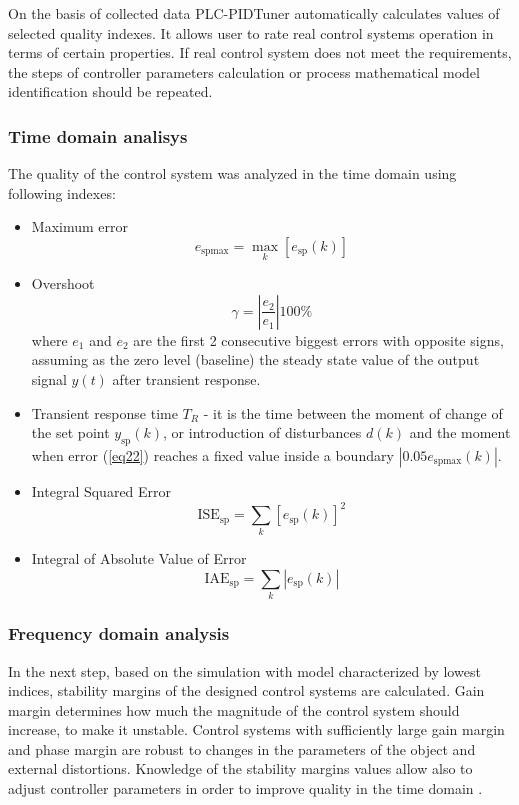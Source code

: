 \documentclass{amcs}
\begin{document}
On the basis of collected data PLC-PIDTuner automatically calculates values of selected quality indexes. It allows user to rate real control systems operation in terms of certain properties. If real control system does not meet the requirements, the steps of controller parameters  calculation or process mathematical model identification should be repeated.
%
\subsubsection{Time domain analisys}
%
The quality of the control system was analyzed in the time domain using following indexes: 
\begin{itemize}
	\item Maximum error 
	\begin{equation}
	e_{\text{sp}\max}=\max_{k}[e_{\text{sp}}(k)]
	\end{equation}\label{eq22}
	\item Overshoot 
	\begin{equation}
	\gamma=\left|\dfrac{e_2}{e_1}\right|100\%
	\end{equation}\label{eq24}
	where $e_1$ and $e_2$ are the first 2 consecutive biggest errors with opposite signs, assuming as the zero level (baseline) the steady state value of the output signal $y(t)$ after transient response.
	\item Transient response time $T_{R}$ - it is the time between the moment of change of the set point $y_{\text{sp}}(k)$, or introduction of disturbances $d(k)$ and the moment when error (\ref{eq22}) reaches a fixed value inside a boundary $|0.05 e_{\text{sp}\max}(k)|$. 
	\item Integral Squared Error 
	\begin{equation}
	\text{ISE}_{\text{sp}}=\sum_{k}[e_{\text{sp}}(k)]^{2} 
	\end{equation}\label{eq25}
	\item Integral of Absolute Value of Error 
	\begin{equation}
	\text{IAE}_{\text{sp}}=\sum_{k}|e_{\text{sp}}(k)| 
	\end{equation}\label{eq26}
\end{itemize}

\subsubsection{Frequency domain analysis}
%
In the next step, based on the simulation with model characterized by lowest indices, stability margins of the designed control systems are calculated. Gain margin determines how much the magnitude of the control system should increase, to make it unstable. Control systems with sufficiently large gain margin and phase margin are robust to changes in the parameters of the object and external distortions. Knowledge of the stability margins values allow also to adjust controller parameters in order to improve quality in the time domain \cite{Mozaryn:2013}.   
%
\end{document}
